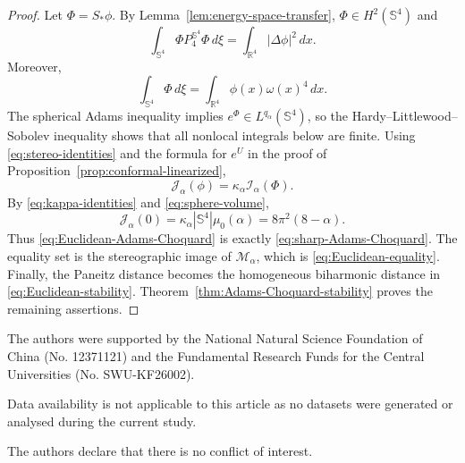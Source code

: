 \documentclass[11pt]{article}
\numberwithin{equation}{section}
\begin{document}
\begin{proof}
Let \(\Phi=S_{*}\phi\). By Lemma~\ref{lem:energy-space-transfer},
\(\Phi\in H^{2}(\mathbb S^{4})\) and
\begin{equation*}
\int_{\mathbb S^{4}}\Phi P_{4}^{\mathbb S^{4}}\Phi\,d\xi
=\int_{\mathbb R^{4}}|\Delta\phi|^{2}\,dx.
\end{equation*}
Moreover,
\begin{equation*}
\int_{\mathbb S^{4}}\Phi\,d\xi
=\int_{\mathbb R^{4}}\phi(x)\omega(x)^{4}\,dx.
\end{equation*}
The spherical Adams inequality implies \(e^{\Phi}\in L^{q_{\alpha}}(\mathbb S^{4})\), so the Hardy--Littlewood--Sobolev inequality shows that all nonlocal integrals below are finite. Using \eqref{eq:stereo-identities} and the formula for \(e^{U}\) in the proof of Proposition~\ref{prop:conformal-linearized},
\begin{equation*}
\mathcal J_{\alpha}(\phi)
=\kappa_{\alpha}\mathcal I_{\alpha}(\Phi).
\end{equation*}
By \eqref{eq:kappa-identities} and \eqref{eq:sphere-volume},
\begin{equation*}
\mathcal J_{\alpha}(0)
=\kappa_{\alpha}|\mathbb S^{4}|\mu_{0}(\alpha)
=8\pi^{2}(8-\alpha).
\end{equation*}
Thus \eqref{eq:Euclidean-Adams-Choquard} is exactly \eqref{eq:sharp-Adams-Choquard}. The equality set is the stereographic image of \(\mathcal M_{\alpha}\), which is \eqref{eq:Euclidean-equality}. Finally, the Paneitz distance becomes the homogeneous biharmonic distance in \eqref{eq:Euclidean-stability}. Theorem~\ref{thm:Adams-Choquard-stability} proves the remaining assertions.
\end{proof}



The authors were supported by the National Natural Science Foundation of China (No. 12371121) and the Fundamental Research Funds for the Central Universities (No. SWU-KF26002).


Data availability is not applicable to this article as no datasets were generated or analysed during the current study.


The authors declare that there is no conflict of interest.
\end{document}
